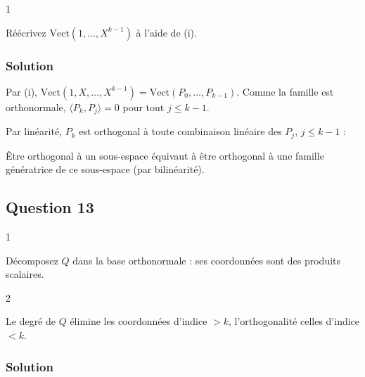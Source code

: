 \documentclass[11pt,a4paper]{article}
\newcommand{\equationajustee}[1]{%
  \sbox{\boiteequation}{$\displaystyle #1$}%
  \ifdim\wd\boiteequation>\linewidth
    \[\resizebox{\linewidth}{!}{\usebox{\boiteequation}}\]%
  \else
    \[#1\]%
  \fi}
\begin{document}
\begin{indication}{1}

Réécrivez \(\mathrm{Vect}(1,\dots,X^{k-1})\) à l'aide de (i).

\end{indication}

\hypertarget{solution-11}{%
\subsubsection{Solution}\label{solution-11}}

Par (i), \(\mathrm{Vect}(1,\allowbreak X,\allowbreak \dots,\allowbreak X^{k-1})=\mathrm{Vect}(P_0,\allowbreak \dots,\allowbreak P_{k-1})\). Comme la famille est orthonormale, \(\langle P_k,P_j\rangle=0\) pour tout \(j\leqslant k-1\).

Par linéarité, \(P_k\) est orthogonal à toute combinaison linéaire des \(P_j\), \(j\leqslant k-1\) :

\equationajustee{P_k\in\mathrm{Vect}(1,X,\dots,X^{k-1})^\perp.}

\begin{methode}

Être orthogonal à un sous-espace équivaut à être orthogonal à une famille génératrice de ce sous-espace (par bilinéarité).

\end{methode}

\hypertarget{question-13}{%
\subsection{Question 13}\label{question-13}}

\begin{indication}{1}

Décomposez \(Q\) dans la base orthonormale : ses coordonnées sont des produits scalaires.

\end{indication}

\begin{indication}{2}

Le degré de \(Q\) élimine les coordonnées d'indice \(>k\), l'orthogonalité celles d'indice \(<k\).

\end{indication}

\hypertarget{solution-12}{%
\subsubsection{Solution}\label{solution-12}}
\end{document}

